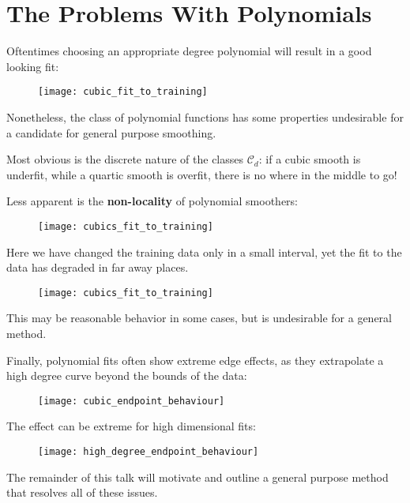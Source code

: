 \section{The Problems With Polynomials}
%
\begin{frame}
  Oftentimes choosing an appropriate degree polynomial will result in a  good looking fit:
  \begin{figure}
    \texttt{[image: cubic\_fit\_to\_training]}
  \end{figure}
  Nonetheless, the class of polynomial functions has some properties undesirable for a candidate for general purpose smoothing.
\end{frame}
%
\begin{frame}
  Most obvious is the discrete nature of the classes $\mathcal{C}_d$: if a cubic smooth is underfit, while a quartic smooth is overfit, there is no where in the middle to go!
\end{frame}
%
\begin{frame}
  Less apparent is the \textbf{non-locality} of polynomial smoothers:
  \begin{figure}
    \texttt{[image: cubics\_fit\_to\_training]}
  \end{figure}
\end{frame}
%
\begin{frame}
  Here we have changed the training data only in a small interval, yet the fit to the data has degraded in far away places.
  \begin{figure}
    \texttt{[image: cubics\_fit\_to\_training]}
  \end{figure}
  This may be reasonable behavior in some cases, but is undesirable for a general method.
\end{frame}
%
\begin{frame}
  Finally, polynomial fits often show extreme edge effects, as they extrapolate a high degree curve beyond the bounds of the data:
   \begin{figure}
    \texttt{[image: cubic\_endpoint\_behaviour]}
  \end{figure}
\end{frame}
%
\begin{frame}
  The effect can be extreme for high dimensional fits:
  \begin{figure}
    \texttt{[image: high\_degree\_endpoint\_behaviour]}
  \end{figure}
\end{frame}
%
\begin{frame}
  The remainder of this talk will motivate and outline a general purpose method that resolves all of these issues.
\end{frame}	

